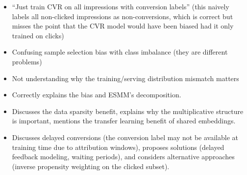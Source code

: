 \begin{interviewq}
\redflags
\begin{itemize}
    \item ``Just train CVR on all impressions with conversion labels'' (this naively labels all non-clicked impressions as non-conversions, which is correct but misses the point that the CVR model would have been biased had it only trained on clicks)
    \item Confusing sample selection bias with class imbalance (they are different problems)
    \item Not understanding why the training/serving distribution mismatch matters
\end{itemize}


\goodgreat
\begin{itemize}
    \item {} Correctly explains the bias and ESMM's decomposition.
    \item {} Discusses the data sparsity benefit, explains why the multiplicative structure is important, mentions the transfer learning benefit of shared embeddings.
    \item {} Discusses delayed conversions (the conversion label may not be available at training time due to attribution windows), proposes solutions (delayed feedback modeling, waiting periods), and considers alternative approaches (inverse propensity weighting on the clicked subset).
\end{itemize}

\end{interviewq}

